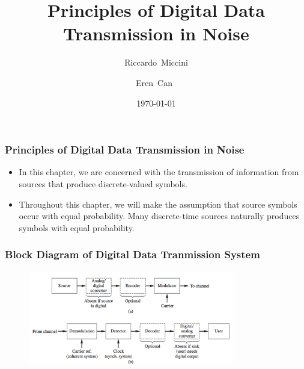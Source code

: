 \documentclass{beamer}
\title{Principles of Digital Data Transmission in Noise}
\subtitle{}
\author[Riccardo \and Eren]{Riccardo~Miccini\inst{1} \and Eren~Can~\inst{1}}
\institute[DTU]
{
	\inst{1}
	Technical University of Denmark\\
	Digital Communication
}
\date{\today}
\begin{document}
	\frame{\titlepage}
	\begin{frame}
		\frametitle{Principles of Digital Data Transmission in Noise}
	\begin{itemize}
	\item In this chapter, we are concerned with the transmission of information from sources that produce discrete-valued symbols.
	\item	 Throughout this chapter, we will make the assumption that source symbols occur with equal probability. Many discrete-time sources naturally produces symbols with equal probability.
	\end{itemize}
	\end{frame}
	\begin{frame}
		\frametitle{Block Diagram of  Digital Data Tranmission System}
		\begin{figure}
		\includegraphics[width=0.8\textwidth]{figure-text7.png}
		\end{figure}
		\end{frame}				
\end{document}
